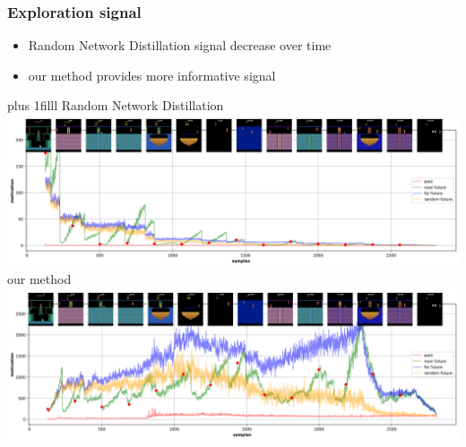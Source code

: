 \documentclass{beamer}
\begin{document}
\begin{frame}
\begin{columns}
  \end{columns}
  
\end{frame}


\begin{frame}
  \frametitle{Exploration signal}
  
  \begin{itemize}
    \item Random Network Distillation signal decrease over time
    \item our method provides more informative signal
  \end{itemize} 
  
  \vskip 0pt plus 1filll 
  {\Large Random Network Distillation} \\
  \includegraphics[scale=0.2]{../results/novelty_detection/rnd_result_summary.png}
  \\
  {\Large our method} \\
  \includegraphics[scale=0.2]{../results/novelty_detection/cnd_vicreg_result_summary.png}

\end{frame}
\end{document}
